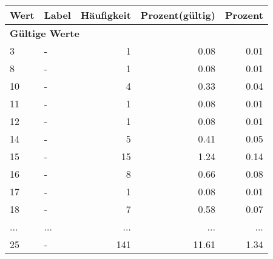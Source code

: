      \begin{longtable}{lXrrr}
     \toprule
     \textbf{Wert} & \textbf{Label} & \textbf{Häufigkeit} & \textbf{Prozent(gültig)} & \textbf{Prozent} \\
     \endhead
     \midrule
     \multicolumn{5}{l}{\textbf{Gültige Werte}}\\
        3 & \multicolumn{1}{X}{-} & %
          \num{1} &
          \num[round-mode=places,round-precision=2]{0,08} &
          \num[round-mode=places,round-precision=2]{0,01} \\
        8 & \multicolumn{1}{X}{-} & %
          \num{1} &
          \num[round-mode=places,round-precision=2]{0,08} &
          \num[round-mode=places,round-precision=2]{0,01} \\
        10 & \multicolumn{1}{X}{-} & %
          \num{4} &
          \num[round-mode=places,round-precision=2]{0,33} &
          \num[round-mode=places,round-precision=2]{0,04} \\
        11 & \multicolumn{1}{X}{-} & %
          \num{1} &
          \num[round-mode=places,round-precision=2]{0,08} &
          \num[round-mode=places,round-precision=2]{0,01} \\
        12 & \multicolumn{1}{X}{-} & %
          \num{1} &
          \num[round-mode=places,round-precision=2]{0,08} &
          \num[round-mode=places,round-precision=2]{0,01} \\
        14 & \multicolumn{1}{X}{-} & %
          \num{5} &
          \num[round-mode=places,round-precision=2]{0,41} &
          \num[round-mode=places,round-precision=2]{0,05} \\
        15 & \multicolumn{1}{X}{-} & %
          \num{15} &
          \num[round-mode=places,round-precision=2]{1,24} &
          \num[round-mode=places,round-precision=2]{0,14} \\
        16 & \multicolumn{1}{X}{-} & %
          \num{8} &
          \num[round-mode=places,round-precision=2]{0,66} &
          \num[round-mode=places,round-precision=2]{0,08} \\
        17 & \multicolumn{1}{X}{-} & %
          \num{1} &
          \num[round-mode=places,round-precision=2]{0,08} &
          \num[round-mode=places,round-precision=2]{0,01} \\
        18 & \multicolumn{1}{X}{-} & %
          \num{7} &
          \num[round-mode=places,round-precision=2]{0,58} &
          \num[round-mode=places,round-precision=2]{0,07} \\
       ... & ... & ... & ... & ... \\
        25 & \multicolumn{1}{X}{-} & %
          \num{141} &
          \num[round-mode=places,round-precision=2]{11,61} &
          \num[round-mode=places,round-precision=2]{1,34} \\


\end{longtable}
